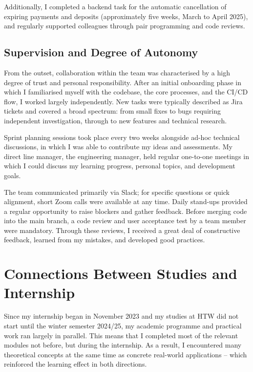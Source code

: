 \documentclass[a4paper, 12pt]{article}
\let\oldsection\section
\renewcommand{\section}{\clearpage\oldsection}
\begin{document}
Additionally, I completed a backend task for the automatic cancellation of expiring
payments and deposits (approximately five weeks, March to April 2025), and regularly supported colleagues through pair programming and
code reviews.

\subsection{Supervision and Degree of Autonomy}

From the outset, collaboration within the team was characterised by a high degree of
trust and personal responsibility. After an initial onboarding phase in which I
familiarised myself with the codebase, the core processes, and the CI/CD flow, I worked
largely independently. New tasks were typically described as Jira tickets and covered a
broad spectrum: from small fixes to bugs requiring independent investigation, through
to new features and technical research.

Sprint planning sessions took place every two weeks alongside ad-hoc technical
discussions, in which I was able to contribute my ideas and assessments. My direct line
manager, the engineering manager, held regular one-to-one meetings in which I could
discuss my learning progress, personal topics, and development goals.

The team communicated primarily via Slack; for specific questions or quick alignment,
short Zoom calls were available at any time. Daily stand-ups provided a regular
opportunity to raise blockers and gather feedback. Before merging code into the main
branch, a code review and user acceptance test by a team member were mandatory. Through
these reviews, I received a great deal of constructive feedback, learned from my
mistakes, and developed good practices.


\section{Connections Between Studies and Internship}

Since my internship began in November 2023 and my studies at HTW did not start until
the winter semester 2024/25, my academic programme and practical work ran largely in
parallel. This means that I completed most of the relevant modules not before, but
during the internship. As a result, I encountered many theoretical concepts at the same
time as concrete real-world applications -- which reinforced the learning effect in
both directions.
\end{document}
